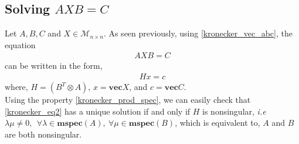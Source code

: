 \subsection{Solving $AXB=C$}
Let $A,B,C$ and $X \in \mathcal{M}_{n \times n}$. As seen previously, using \ref{kronecker_vec_abc}, the equation 
\begin{align}
\label{kronecker_eq2}
AXB=C
\end{align}
can be written in the form,
\begin{align}
H x = c
\end{align}
where,
$H = (B^T \otimes A)$, $x = \mathbf{vec}X $, and $c = \mathbf{vec}C$.
\\
Using the property \ref{kronecker_prod_spec}, we can easily check that \ref{kronecker_eq2} has a unique solution if and only if $H$ is nonsingular, \textit{i.e} $\lambda  \mu \neq 0,~~\forall \lambda \in \mathbf{mspec}(A),~\forall \mu \in \mathbf{mspec}(B)$, which is equivalent to, $A$ and $B$ are both nonsingular.


